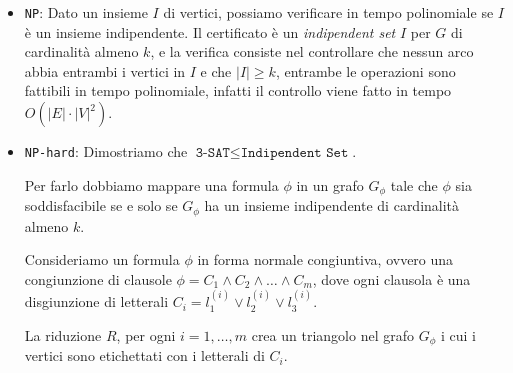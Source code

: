 \begin{itemize}
    \item \texttt{NP}: Dato un insieme $I$ di vertici, possiamo verificare in tempo polinomiale
    se $I$ è un insieme indipendente. Il certificato è un \textit{indipendent set} $I$ per 
    $G$ di cardinalità almeno $k$, e la verifica consiste nel controllare che nessun arco abbia
    entrambi i vertici in $I$ e che $|I| \geq k$, entrambe le operazioni sono fattibili in tempo
    polinomiale, infatti il controllo viene fatto in tempo $O(|E| \cdot |V|^2)$.
    \item \texttt{NP-hard}: Dimostriamo che $\texttt{3-SAT} \leq \texttt{Indipendent Set}$.
    
    Per farlo dobbiamo mappare una formula $\phi$ in un grafo $G_\phi$ tale che $\phi$ sia soddisfacibile
    se e solo se $G_\phi$ ha un insieme indipendente di cardinalità almeno $k$.

    Consideriamo un formula $\phi$ in forma normale congiuntiva, ovvero una congiunzione di clausole
    $\phi = C_1 \land C_2 \land \ldots \land C_m$, dove ogni clausola è una disgiunzione di letterali
    $C_i = l_{1}^{(i)} \lor l_{2}^{(i)} \lor l_{3}^{(i)}$.

    La riduzione $R$, per ogni $i = 1, \ldots, m$ crea un triangolo nel grafo $G_\phi$ i cui i vertici sono 
    etichettati con i letterali di $C_i$.
    \begin{figure}[H]
        \centering 
\end{figure}
\end{itemize}
